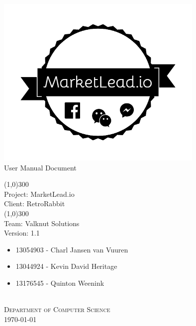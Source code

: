 \documentclass{article}
\begin{document}
	\begin{titlepage}
		\begin{center}
			\includegraphics[width=10cm]{images/marketlead_logo.png}  \\
			[0.5cm]
			\huge{
			User Manual Document\\
			}
			
			\line(1,0){300}\\
			[0.2cm]
			\LARGE{Project: MarketLead.io\\
			Client: RetroRabbit} \\
			\line(1,0){300}\\
			\LARGE{Team: Valknut Solutions}\\
			[1.0cm]
			\large{Version: 1.1}\\
			[1.0cm]
			\large
			{
			\begin{itemize}
				\item 13054903 - Charl Jansen van Vuuren
				\item 13044924 - Kevin David Heritage
				\item 13176545 - Quinton Weenink\\
			\end{itemize}
			}
			\textsc{\large}\\
		[3.0cm]
		\textsc{\large  Department of Computer Science}\\
		[0.5cm]
		\textsc{\large \today}\\
		\end{center}
	\end{titlepage}
	
	\cleardoublepage
	\begin{versionhistory}
	\end{versionhistory}	
	
\end{document}
